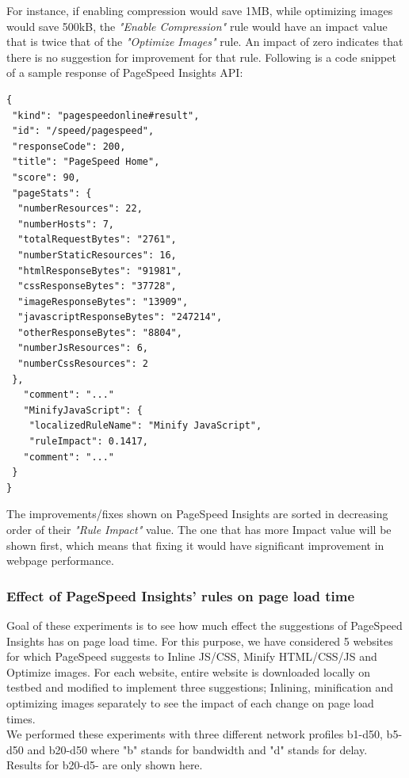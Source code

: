 \noindent For instance, if enabling compression would save 1MB, while optimizing images would save 500kB, the {\em "Enable Compression"} rule would have an impact value that is twice that of the {\em "Optimize Images"} rule. An impact of zero indicates that there is no suggestion for improvement for that rule.
Following is a code snippet of a sample response of PageSpeed Insights API:
\begin{verbatim}
{
 "kind": "pagespeedonline#result",
 "id": "/speed/pagespeed",
 "responseCode": 200,
 "title": "PageSpeed Home",
 "score": 90,
 "pageStats": {
  "numberResources": 22,
  "numberHosts": 7,
  "totalRequestBytes": "2761",
  "numberStaticResources": 16,
  "htmlResponseBytes": "91981",
  "cssResponseBytes": "37728",
  "imageResponseBytes": "13909",
  "javascriptResponseBytes": "247214",
  "otherResponseBytes": "8804",
  "numberJsResources": 6,
  "numberCssResources": 2
 },
   "comment": "..."
   "MinifyJavaScript": {
    "localizedRuleName": "Minify JavaScript",
    "ruleImpact": 0.1417,
   "comment": "..."
 }
}
\end{verbatim}
The improvements/fixes shown on PageSpeed Insights are sorted in decreasing order of their {\em "Rule Impact"} value. The one that has more Impact value will be shown first, which means that fixing it would have significant improvement in webpage performance.
\subsubsection{ Effect of PageSpeed Insights' rules on page load time}
Goal of these experiments is to see how much effect the suggestions of PageSpeed Insights has on page load time. For this purpose, we have considered 5 websites for which PageSpeed suggests to Inline JS/CSS, Minify HTML/CSS/JS and Optimize images. For each website, entire website is downloaded locally on testbed and modified to implement three suggestions; Inlining, minification and optimizing images separately to see the impact of each change on page load times. \\
\noindent We performed these experiments with three different network profiles b1-d50, b5-d50 and b20-d50 where "b" stands for bandwidth and "d" stands for delay. Results for b20-d5- are only shown here.

